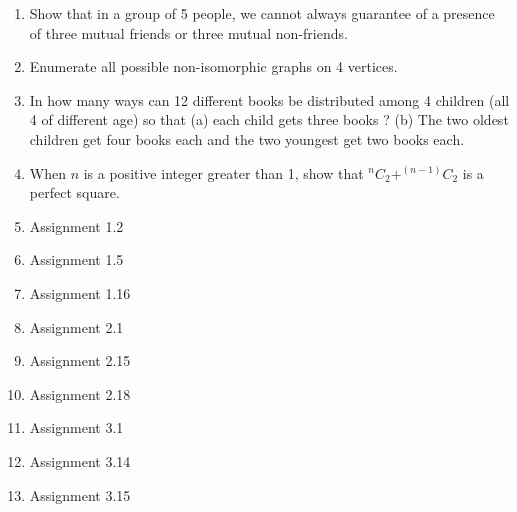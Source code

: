 \documentclass{article}
\begin{document}
\begin{enumerate}
    \item Show that in a group of 5 people, we cannot always guarantee of a presence of three mutual friends or three mutual non-friends. 
    \item Enumerate all possible non-isomorphic graphs on 4 vertices.
    \item In how many ways can 12 different books be distributed among 4 children (all 4 of different age) so that (a) each child gets three books ? (b) The two oldest children get four books each and the two youngest get two books each. 
    \item When $n$ is a positive integer greater than 1, show that $^nC_2+^{(n-1)}C_2$ is a perfect square. 
    \item Assignment 1.2 
    \item Assignment 1.5 
    \item Assignment 1.16 
    \item Assignment 2.1 
    \item Assignment 2.15 
    \item Assignment 2.18 
    \item Assignment 3.1 
    \item Assignment 3.14 
    \item Assignment 3.15 







\end{enumerate}
\end{document}
